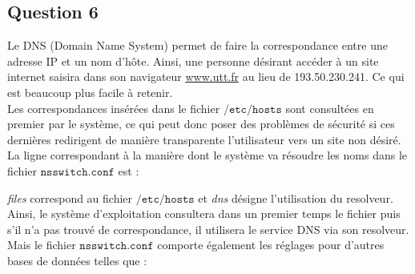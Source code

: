 \documentclass[12pt,a4paper,notitlepage]{article}
\begin{document}
\subsection{Question 6}
Le DNS (Domain Name System) permet de faire la correspondance entre une adresse IP et un nom d'hôte. Ainsi, une personne désirant accéder à un site internet saisira dans son navigateur \url{www.utt.fr} au lieu de 193.50.230.241. Ce qui est beaucoup plus facile à retenir.\\

Les correspondances insérées dans le fichier $\mathtt{/etc/hosts}$ sont consultées en premier par le système, ce qui peut donc poser des problèmes de sécurité si ces dernières redirigent de manière transparente l'utilisateur vers un site non désiré.\\

\noindent La ligne correspondant à la manière dont le système va résoudre les noms dans le fichier $\mathtt{nsswitch.conf}$ est :


\begin{center}
 \end{center}


\emph{files} correspond au fichier $\mathtt{/etc/hosts}$ et \emph{dns} désigne l'utilisation du resolveur. Ainsi, le système d'exploitation consultera dans un premier temps le fichier puis s'il n'a pas trouvé de correspondance, il utilisera le service DNS via son resolveur.\\

Mais le fichier $\mathtt{nsswitch.conf}$ comporte également les réglages pour d'autres bases de données telles que :

\begin{center}
 \end{center}
\end{document}
